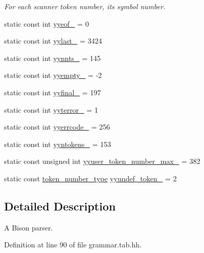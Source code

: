 \begin{DoxyCompactItemize}
\begin{DoxyCompactList}\small\item\em For each scanner token number, its symbol number. \end{DoxyCompactList}\item 
static const int \hyperlink{classyy_1_1_parser_implementation_a100203a99a389f23410e7085f1b89b4a}{yyeof\_\-} = 0
\item 
static const int \hyperlink{classyy_1_1_parser_implementation_afd8a2a47960359119acc51fa86ef7a76}{yylast\_\-} = 3424
\item 
static const int \hyperlink{classyy_1_1_parser_implementation_aa39f5394c3ec849cf56500b2047aec78}{yynnts\_\-} = 145
\item 
static const int \hyperlink{classyy_1_1_parser_implementation_ae3d49f6dceae1837e7ebaedab925ff48}{yyempty\_\-} = -\/2
\item 
static const int \hyperlink{classyy_1_1_parser_implementation_a746cd84070b8de7d559eb2c8fc4bedf4}{yyfinal\_\-} = 197
\item 
static const int \hyperlink{classyy_1_1_parser_implementation_ac7dd39ad90b22b9c231e5ff2e794f7e0}{yyterror\_\-} = 1
\item 
static const int \hyperlink{classyy_1_1_parser_implementation_a4e121e871a017ecac45c6ca610f1d274}{yyerrcode\_\-} = 256
\item 
static const int \hyperlink{classyy_1_1_parser_implementation_a919348059068292e27619af10fb47779}{yyntokens\_\-} = 153
\item 
static const unsigned int \hyperlink{classyy_1_1_parser_implementation_a757e1d8437b95246c3184f629a57c0f9}{yyuser\_\-token\_\-number\_\-max\_\-} = 382
\item 
static const \hyperlink{classyy_1_1_parser_implementation_a729ec5de6d4445eb556d2db42cbb4bde}{token\_\-number\_\-type} \hyperlink{classyy_1_1_parser_implementation_ae165b3749bef9df3a32f28b146f23af9}{yyundef\_\-token\_\-} = 2
\end{DoxyCompactItemize}


\subsection{Detailed Description}
A Bison parser. 

Definition at line 90 of file grammar.tab.hh.



